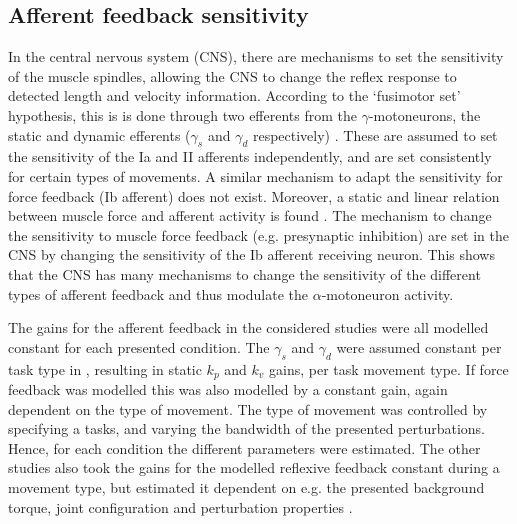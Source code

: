 \subsection{Afferent feedback sensitivity}
In the central nervous system (CNS), there are mechanisms to set the sensitivity of the muscle spindles, allowing the CNS to change the reflex response to detected length and velocity information. According to the `fusimotor set' hypothesis, this is is done through two efferents from the $\gamma$-motoneurons, the static and dynamic efferents ($\gamma_s$ and $\gamma_d$ respectively) \cite{prochazka_fusimotor_1985}. These are assumed to set the sensitivity of the Ia and II afferents independently, and are set consistently for certain types of movements. A similar mechanism to adapt the sensitivity for force feedback (Ib afferent) does not exist. Moreover, a static and linear relation between muscle force and afferent activity is found \cite{crago_sampling_1982}. The mechanism to change the sensitivity to muscle force feedback (e.g. presynaptic inhibition) are set in the CNS by changing the sensitivity of the Ib afferent receiving neuron. This shows that the CNS has many mechanisms to change the sensitivity of the different types of afferent feedback and thus modulate the $\alpha$-motoneuron activity. 

The gains for the afferent feedback in the considered studies were all modelled constant for each presented condition. The $\gamma_s$ and $\gamma_d$ were assumed constant per task type in \cite{van_der_helm_identification_2002, schouten_nmclab_2008, mugge_rigorous_2010}, resulting in static $k_p$ and $k_v$ gains, per task movement type. If force feedback was modelled this was also modelled by a constant gain, again dependent on the type of movement. The type of movement was controlled by specifying a tasks, and varying the bandwidth of the presented perturbations. Hence, for each condition the different parameters were estimated. The other studies also took the gains for the modelled reflexive feedback constant during a movement type, but estimated it dependent on  e.g. the presented background torque, joint configuration and perturbation properties \cite{zhang_simultaneous_1997, mirbagheri_intrinsic_2000}. 



